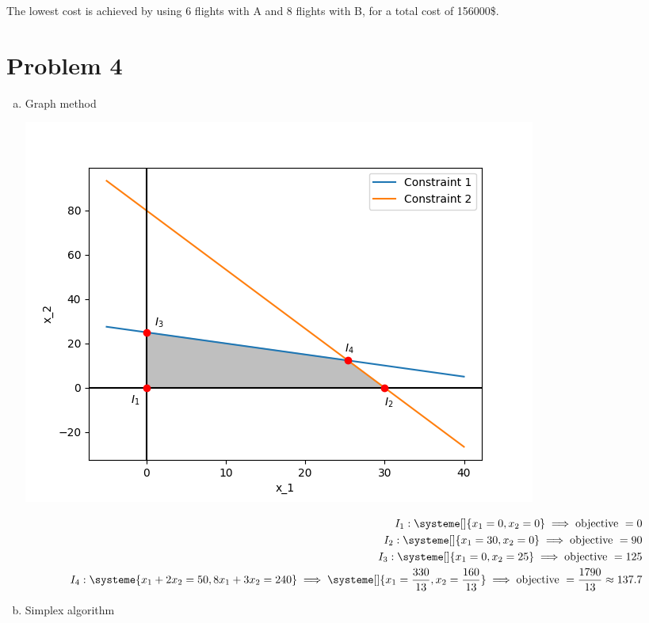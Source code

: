 \documentclass[a4paper, 10pt, twoside]{article}
\begin{document}
\begin{enumerate}[a)]
          The lowest cost is achieved by using 6 flights with A and 8 flights with B, for a total cost of 156000\$.

\end{enumerate}

\section*{Problem 4}

\begin{enumerate}[a)]
    \item Graph method
          \begin{center}
              \includegraphics[width = .5 \textwidth]{graph3.png}
          \end{center}

          \begin{align*}
              I_1 :
              \systeme[]{
                  x_1 = 0,
                  x_2 = 0
              }
              \implies \text{objective } = 0                             \\
              I_2 :
              \systeme[]{
                  x_1 = 30,
                  x_2 = 0
              }
              \implies \text{objective } = 90                            \\
              I_3 :
              \systeme[]{
                  x_1 = 0,
                  x_2 = 25
              }
              \implies \text{objective } = 125                           \\
              I_4 :
              \systeme{
                  x_1+2x_2=50,
                  8x_1+3x_2=240
              }
              \implies
              \systeme[]{
                  x_1 = \frac{330}{13},
                  x_2 = \frac{160}{13}
              }
              \implies \text{objective } = \frac{1790}{13} \approx 137.7 \\
          \end{align*}

    \item Simplex algorithm


\end{enumerate}
\end{document}
